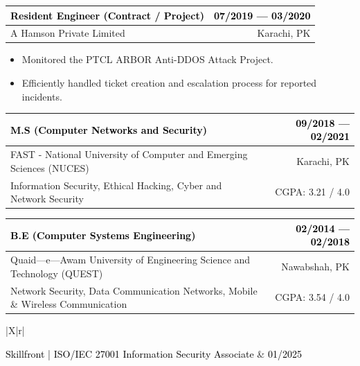 \documentclass{resume}
\begin{document}
\begin{tabularx}{\linewidth}{|X|r|}
    \hline
    
    \cellcolor{lightblue}\textcolor{black}{Resident Engineer (Contract / Project)} & 
    \cellcolor{lightblue}\textcolor{black}{07/2019 --- 03/2020} \\
    \hline
    
    A Hamson Private Limited & Karachi, PK \\
    \hline
\end{tabularx}
\begin{itemize}
\item {} Monitored the PTCL ARBOR Anti-DDOS Attack Project.
\item {} Efficiently handled ticket creation and escalation process for reported incidents.
\end{itemize}

\begin{tabularx}{\linewidth}{|X|r|}
    \hline
    
    \cellcolor{lightblue}\textcolor{black}{M.S (Computer Networks and Security)} & 
    \cellcolor{lightblue}\textcolor{black}{09/2018 --- 02/2021} \\
    \hline
    
    FAST - National University of Computer and Emerging Sciences (NUCES) & Karachi, PK \\
    \hline
    
    Information Security, Ethical Hacking, Cyber and Network Security & CGPA: 3.21 / 4.0 \\
    \hline
\end{tabularx}

\divider

\begin{tabularx}{\linewidth}{|X|r|}
    \hline
    
    \cellcolor{lightblue}\textcolor{black}{B.E (Computer Systems Engineering)} & 
    \cellcolor{lightblue}\textcolor{black}{02/2014 --- 02/2018} \\
    \hline
    
    Quaid---e---Awam University of Engineering Science and Technology (QUEST) & Nawabshah, PK \\
    \hline
    
    Network Security, Data Communication Networks, Mobile \& Wireless Communication & CGPA: 3.54 / 4.0 \\
    \hline
\end{tabularx}
\begin{tabularx}{\linewidth}{|X|r|}
    \hline
    
    \textcolor{black}{Skillfront | ISO/IEC 27001 Information Security Associate} & 
    \textcolor{black}{01/2025} \\
    \hline
    
     \\
    \hline
\end{tabularx}
\end{document}
